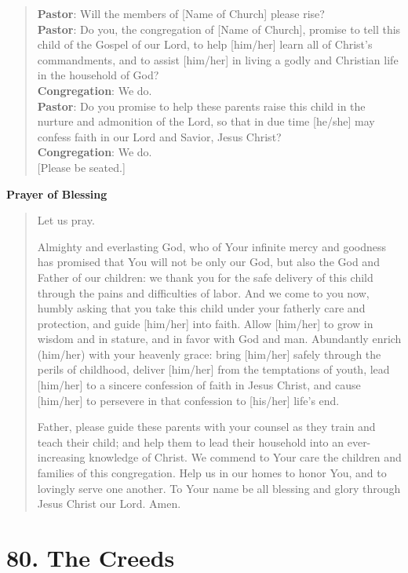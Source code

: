 \documentclass[
]{book}
\begin{document}
\begin{quote}
\textbf{Pastor}: Will the members of {[}Name of Church{]} please rise?\\
\textbf{Pastor}: Do you, the congregation of {[}Name of Church{]}, promise to tell this child of the Gospel of our Lord, to help {[}him/her{]} learn all of Christ's commandments, and to assist {[}him/her{]} in living a godly and Christian life in the household of God?\\
\textbf{Congregation}: We do.\\
\textbf{Pastor}: Do you promise to help these parents raise this child in the nurture and admonition of the Lord, so that in due time {[}he/she{]} may confess faith in our Lord and Savior, Jesus Christ?\\
\textbf{Congregation}: We do.\\
{[}Please be seated.{]}
\end{quote}

\textbf{Prayer of Blessing}

\begin{quote}
Let us pray.

Almighty and everlasting God, who of Your infinite mercy and goodness has promised that You will not be only our God, but also the God and Father of our children: we thank you for the safe delivery of this child through the pains and difficulties of labor. And we come to you now, humbly asking that you take this child under your fatherly care and protection, and guide {[}him/her{]} into faith. Allow {[}him/her{]} to grow in wisdom and in stature, and in favor with God and man. Abundantly enrich (him/her) with your heavenly grace: bring {[}him/her{]} safely through the perils of childhood, deliver {[}him/her{]} from the temptations of youth, lead {[}him/her{]} to a sincere confession of faith in Jesus Christ, and cause {[}him/her{]} to persevere in that confession to {[}his/her{]} life's end.

Father, please guide these parents with your counsel as they train and teach their child; and help them to lead their household into an ever-increasing knowledge of Christ. We commend to Your care the children and families of this congregation. Help us in our homes to honor You, and to lovingly serve one another. To Your name be all blessing and glory through Jesus Christ our Lord. Amen.
\end{quote}

\hypertarget{the-creeds}{%
\section*{80. The Creeds}\label{the-creeds}}
\end{document}
